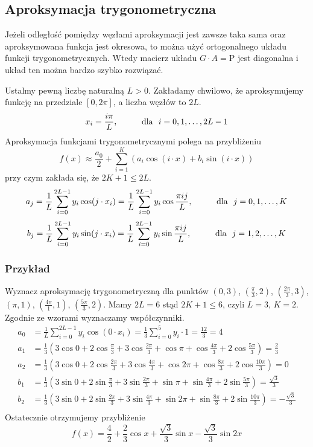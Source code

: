 \documentclass[../mn-notatki.tex]{subfiles}
\begin{document}
\subsection{Aproksymacja trygonometryczna}

Jeżeli odległość pomiędzy węzłami aproksymacji jest
zawsze taka sama oraz aproksymowana funkcja jest okresowa, to można
użyć ortogonalnego układu funkcji trygonometrycznych. Wtedy macierz
układu $G \cdot A = \mathrm{P}$ jest diagonalna i układ ten można bardzo szybko
rozwiązać.\\

\begin{tcolorbox}
Ustalmy pewną liczbę naturalną $L > 0$. Zakładamy chwilowo, że aproksymujemy
funkcję na przedziale $[0, 2\pi]$, a liczba węzłów to $2L$.
\[
x_i = \frac{i\pi}{L}, \hspace*{1cm} \text{dla}~~ i = 0, 1, \ldots, 2L - 1
\]
Aproksymacja funkcjami trygonometrycznymi polega na przybliżeniu
\[
f(x) \approx \frac{a_0}{2} + \sum_{i=1}^{K}\left(
a_i \cos(i \cdot x) + b_i \sin(i \cdot x)
\right)
\]
przy czym zakłada się, że $2K + 1 \leqslant 2L$.
\[
a_j = \frac{1}{L} \sum_{i=0}^{2L-1} y_i \cos(j \cdot x_i)
= \frac{1}{L} \sum_{i=0}^{2L-1} y_i \cos \frac{\pi i j}{L}
,\hspace*{1cm} \text{dla} ~~j = 0, 1, \ldots, K
\]
\[
b_j = \frac{1}{L} \sum_{i=0}^{2L-1} y_i \sin(j \cdot x_i)
= \frac{1}{L} \sum_{i=0}^{2L-1} y_i \sin \frac{\pi i j}{L}
,\hspace*{1cm} \text{dla} ~~j = 1, 2, \ldots, K
\]
\end{tcolorbox}

\pagebreak

\subsubsection{Przykład}
Wyznacz aproksymację trygonometryczną dla punktów
$
\left(  0, 3 \right)
$,
$
\left(  \frac{\pi}{3},  2 \right)
$,
$
\left(  \frac{2\pi}{3}, 3 \right)
$,
$
\left(  \pi, 1 \right)
$,
$
\left(  \frac{4\pi}{1}, 1 \right)
$,
$
\left(  \frac{5\pi}{3}, 2 \right)
$.
Mamy $2L = 6$ stąd $2K + 1 \leqslant 6$, czyli $L = 3$, $K = 2$. Zgodnie ze
wzorami wyznaczamy współczynniki.
\begin{align*}
a_0 &= \frac{1}{L} \sum_{i=0}^{2L-1} y_i \cos(0 \cdot x_i)
= \frac{1}{3} \sum_{i=0}^{5}y_i \cdot 1
= \frac{12}{3} = 4\\
a_1 &= \frac{1}{3} \left(
3\cos 0 + 2 \cos \frac{\pi}{3} + 3 \cos \frac{2\pi}{3} + \cos \pi
+ \cos \frac{4\pi}{3} + 2 \cos \frac{5\pi}{3}
\right) = \frac{2}{3}\\
a_2 &= \frac{1}{3} \left(
3\cos 0 + 2 \cos \frac{2\pi}{3} + 3 \cos \frac{4\pi}{3} + \cos 2\pi
+ \cos \frac{8\pi}{3} + 2 \cos \frac{10\pi}{3}
\right) = 0\\
b_1 &= \frac{1}{3} \left(
3\sin 0 + 2 \sin \frac{\pi}{3} + 3 \sin \frac{2\pi}{3} + \sin \pi
+ \sin \frac{4\pi}{3} + 2 \sin \frac{5\pi}{3}
\right) = \frac{\sqrt{3}}{3}\\
b_2 &= \frac{1}{3} \left(
3\sin 0 + 2 \sin \frac{2\pi}{3} + 3 \sin \frac{4\pi}{3} + \sin 2\pi
+ \sin \frac{8\pi}{3} + 2 \sin \frac{10\pi}{3}
\right) = -\frac{\sqrt{3}}{3}\\
\end{align*}
Ostatecznie otrzymujemy przybliżenie
\[
f(x) = \frac{4}{2} + \frac{2}{3} \cos x + \frac{\sqrt{3}}{3} \sin x
- \frac{\sqrt{3}}{3} \sin 2x
\]

\pagebreak
\end{document}
